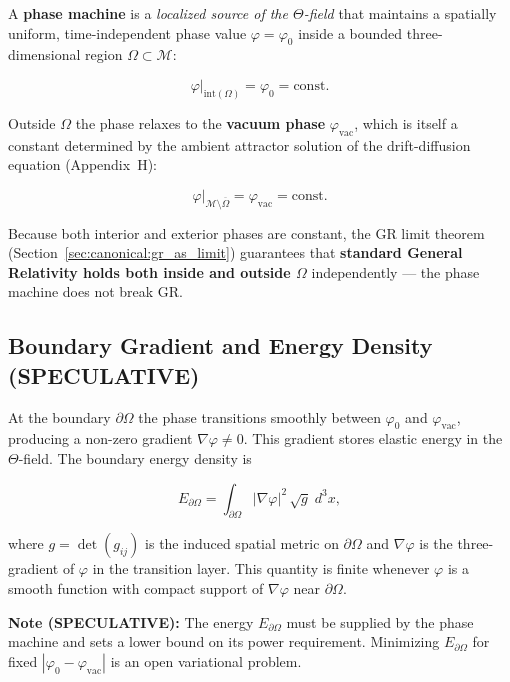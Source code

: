 A \textbf{phase machine} is a \emph{localized source of the $\Theta$-field} that maintains a
spatially uniform, time-independent phase value $\varphi = \varphi_0$ inside a bounded
three-dimensional region $\Omega \subset \mathcal{M}$:

\begin{equation}
\label{eq:pm_interior_phase}
\left.\varphi\right|_{\mathrm{int}(\Omega)} = \varphi_0 = \mathrm{const}.
\end{equation}

Outside $\Omega$ the phase relaxes to the \textbf{vacuum phase} $\varphi_\mathrm{vac}$,
which is itself a constant determined by the ambient attractor solution of the drift-diffusion
equation (Appendix~H):

\begin{equation}
\label{eq:pm_exterior_phase}
\left.\varphi\right|_{\mathcal{M}\setminus\overline{\Omega}} = \varphi_\mathrm{vac} = \mathrm{const}.
\end{equation}

Because both interior and exterior phases are constant, the GR limit theorem
(Section~\ref{sec:canonical:gr_as_limit}) guarantees that \textbf{standard General Relativity
holds both inside and outside $\Omega$} independently — the phase machine does not break GR.

\subsection{Boundary Gradient and Energy Density (SPECULATIVE)}

At the boundary $\partial\Omega$ the phase transitions smoothly between $\varphi_0$ and
$\varphi_\mathrm{vac}$, producing a non-zero gradient $\nabla\varphi \neq 0$.  This gradient
stores elastic energy in the $\Theta$-field.  The boundary energy density is

\begin{equation}
\label{eq:pm_boundary_energy}
E_{\partial\Omega} = \int_{\partial\Omega} |\nabla\varphi|^2\,\sqrt{g}\;d^3x,
\end{equation}

where $g = \det(g_{ij})$ is the induced spatial metric on $\partial\Omega$ and $\nabla\varphi$
is the three-gradient of $\varphi$ in the transition layer.  This quantity is finite whenever
$\varphi$ is a smooth function with compact support of $\nabla\varphi$ near $\partial\Omega$.

\textbf{Note (SPECULATIVE):}  The energy $E_{\partial\Omega}$ must be supplied by the phase
machine and sets a lower bound on its power requirement.  Minimizing $E_{\partial\Omega}$ for
fixed $|\varphi_0 - \varphi_\mathrm{vac}|$ is an open variational problem.

